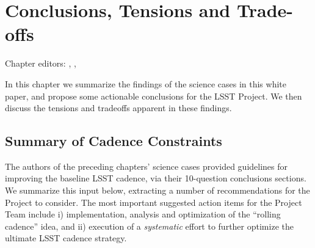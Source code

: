 \chapter[Conclusions, Tensions and Trade-offs]{Conclusions, Tensions and Trade-offs}
\def\chpname{tradeoffs}\label{chp:\chpname}

Chapter editors:
,
,


In this chapter we summarize the findings of the science cases in this
white paper, and propose some actionable conclusions for the LSST Project.
We then discuss the tensions and tradeoffs apparent in these findings.


\section{Summary of Cadence Constraints}


The authors of the preceding chapters' science cases provided guidelines
for improving the baseline LSST cadence, via their 10-question
conclusions sections.  We summarize this input below, extracting a number
of recommendations for the Project to consider. The most important suggested action
items for the Project Team include i) implementation, analysis and
optimization of the ``rolling cadence'' idea, and ii) execution of a
{\it systematic} effort to further optimize the ultimate LSST cadence
strategy.

